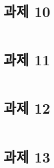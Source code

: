 \documentclass{article}
\begin{document}
\section{과제 10}
\inputminted{java}{../java/Prob10.java}

\section{과제 11}
\inputminted{java}{../java/Prob11.java}

\section{과제 12}
\inputminted{java}{../java/Prob12.java}

\section{과제 13}
\inputminted{java}{../java/Prob13.java}
\end{document}
